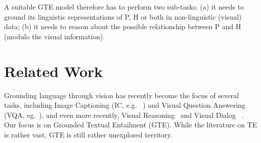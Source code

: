 \documentclass[11pt]{article}
\begin{document}
A suitable GTE model therefore has to perform two sub-tasks: (a) it needs to 
ground its linguistic representations of P, H or both in non-linguistic (visual) data; (b) it needs to
reason about the possible relationship between P and H (modulo the visual information).



 \section{Related Work}
\label{sec:related}
Grounding language through vision has recently become the focus of several tasks, including
Image Captioning (IC, e.g. ~\cite{Hodosh:etal:2013,xu:show15}) and Visual Question Answering
(VQA, eg.~\cite{mali:amul14,anto:vqa15}), and even more recently,
Visual Reasoning~\cite{girs:clev16,suhr-EtAl:2017:Short} and Visual
Dialog ~\cite{das:visdial2017}. Our focus is on Grounded Textual Entailment (GTE). While 
the literature on TE is rather vast,
GTE is still rather unexplored territory.
\end{document}
